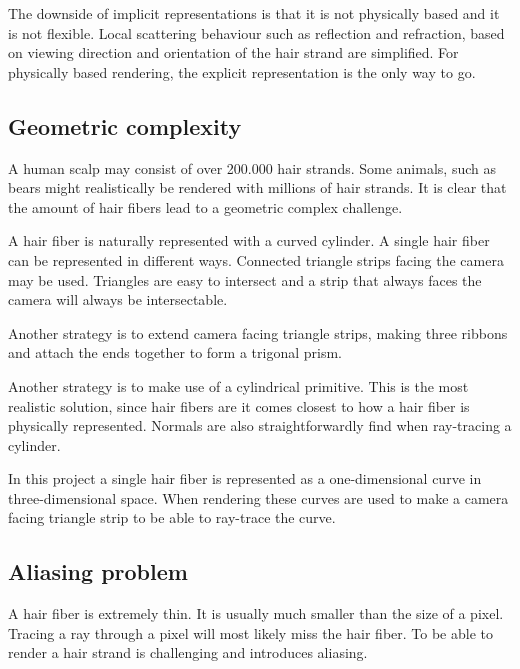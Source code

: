 \documentclass[11pt,a4paper]{report}
\begin{document}




The downside of implicit representations is that it is not physically based and it is not flexible. Local scattering behaviour such as reflection and refraction, based on viewing direction and orientation of the hair strand are simplified. For physically based rendering, the explicit representation is the only way to go.

\subsection{Geometric complexity}

A human scalp may consist of over 200.000 hair strands. Some animals, such as bears might realistically be rendered with millions of hair strands. It is clear that the amount of hair fibers lead to a geometric complex challenge. 

A hair fiber is naturally represented with a curved cylinder. A single hair fiber can be represented in different ways. Connected triangle strips facing the camera may be used. Triangles are easy to intersect and a strip that always faces the camera will always be intersectable.

Another strategy is to extend camera facing triangle strips, making three ribbons and attach the ends together to form a trigonal prism.

Another strategy is to make use of a cylindrical primitive. This is the most realistic solution, since hair fibers are it comes closest to how a hair fiber is physically represented. Normals are also straightforwardly find when ray-tracing a cylinder.

In this project a single hair fiber is represented  as a one-dimensional curve in three-dimensional space. When rendering these curves are used to make a camera facing triangle strip to be able to ray-trace the curve.

\subsection{Aliasing problem}

A hair fiber is extremely thin. It is usually much smaller than the size of a pixel. Tracing a ray through a pixel will most likely miss the hair fiber.  To be able to render a hair strand is challenging and introduces aliasing. 
\end{document}
